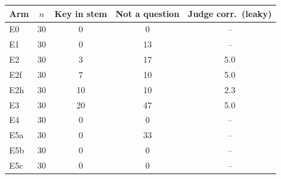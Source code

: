 \begin{tabular}{@{}lcccc@{}}
\toprule
Arm & $n$ & Key in stem & Not a question & Judge corr.\ (leaky) \\
\midrule
E0 & 30 & 0 & 0 & -- \\
E1 & 30 & 0 & 13 & -- \\
E2 & 30 & 3 & 17 & 5.0 \\
E2f & 30 & 7 & 10 & 5.0 \\
E2h & 30 & 10 & 10 & 2.3 \\
E3 & 30 & 20 & 47 & 5.0 \\
E4 & 30 & 0 & 0 & -- \\
E5a & 30 & 0 & 33 & -- \\
E5b & 30 & 0 & 0 & -- \\
E5c & 30 & 0 & 0 & -- \\
\bottomrule
\end{tabular}
